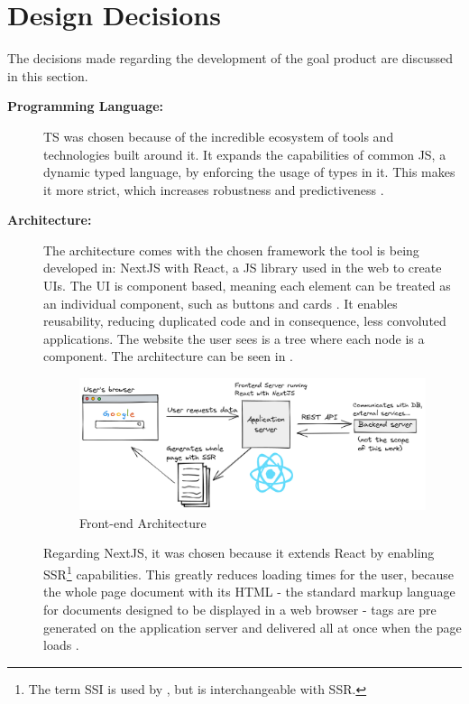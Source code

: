 \section{Design Decisions}\label{ext:design-decisions}

The decisions made regarding the development of the goal product are discussed in this section.

\begin{description}
  \item[\textbf{Programming Language:}] \ac{TS} was chosen because of the incredible ecosystem of tools and technologies built around it. It expands the capabilities of common \ac{JS}, a dynamic typed language, by enforcing the usage of types in it. This makes it more strict, which increases robustness and predictiveness \cite{Bierman_2014}.
  \item[\textbf{Architecture:}] The architecture comes with the chosen framework the tool is being developed in: NextJS with React, a \ac{JS} library used in the web to create \aclp{UI}. The \ac{UI} is component based, meaning each element can be treated as an individual component, such as buttons and cards \cite{facebook_2022}. It enables reusability, reducing duplicated code and in consequence, less convoluted applications. The website the user sees is a tree where each node is a component. The architecture can be seen in .

    \begin{figure}[!htb]
      \caption{Front-end Architecture}\label{fig:arch}
      \begin{center}
        \includegraphics[width=14cm]{img/6-architecture.png}
      \end{center}
    \end{figure}

    Regarding NextJS, it was chosen because it extends React by enabling \ac{SSR}\footnote{The term \ac{SSI} is used by , but is interchangeable with \acl{SSR}.} capabilities. This greatly reduces loading times for the user, because the whole page document with its \ac{HTML} - the standard markup language for documents designed to be displayed in a web browser \cite{patel2013incremental} - tags are pre generated on the application server and delivered all at once when the page loads \cite{DBLP:journals/corr/abs-0801-2618}.


\end{description}
